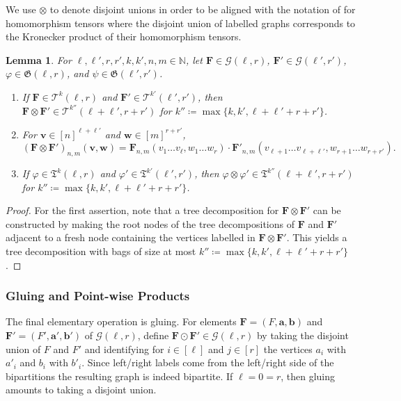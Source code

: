 \documentclass[11pt, DIV=15]{scrarticle}
\theoremstyle{definition}
\theoremstyle{plain}
\newtheorem{lemma}[definition]{Lemma}
\theoremstyle{remark}
\renewcommand{\phi}{\varphi}
\begin{document}
	We use $\otimes$ to denote disjoint unions in order to be aligned with the notation of \cite{mancinska_quantum_2020,seppelt_homomorphism_2024} for homomorphism tensors where the disjoint union of labelled graphs corresponds to the Kronecker product of their homomorphism tensors.
	\begin{lemma}\label{lem:disjoint-union}
		For $\ell, \ell', r,r', k, k', n, m \in \mathbb{N}$,
		let $\boldsymbol{F} \in \mathcal{G}(\ell, r)$,  $\boldsymbol{F}' \in \mathcal{G}(\ell', r')$,  $\phi \in \mathfrak{G}(\ell, r)$, and $\psi \in \mathfrak{G}(\ell', r')$.
		\begin{enumerate}
			\item If $\boldsymbol{F} \in \mathcal{T}^k(\ell, r)$ and $\boldsymbol{F}' \in \mathcal{T}^{k'}(\ell', r')$, then $\boldsymbol{F} \otimes \boldsymbol{F}' \in \mathcal{T}^{k''}(\ell+\ell', r+r')$ for $k'' \coloneqq \max\{k,k', \ell+\ell'+r+r'\}$.
			\item For $\boldsymbol{v} \in [n]^{\ell+\ell'}$ and $\boldsymbol{w} \in [m]^{r+r'}$, 
			\[
				(\boldsymbol{F} \otimes \boldsymbol{F}')_{n,m}(\boldsymbol{v}, \boldsymbol{w}) = \boldsymbol{F}_{n,m}(v_1 \dots v_\ell, w_1 \dots w_r) \cdot \boldsymbol{F}'_{n,m}(v_{\ell+1} \dots v_{\ell+ \ell'}, w_{r+1} \dots w_{r+r'}).
			\]
			\item If $\phi \in \mathfrak{T}^k(\ell, r)$ and $\phi' \in \mathfrak{T}^{k'}(\ell', r')$,
			then $\phi \otimes \phi' \in \mathfrak{T}^{k''}(\ell+\ell', r+r')$ for $k'' \coloneqq \max\{k,k', \ell+\ell'+r+r'\}$.
		\end{enumerate}
	\end{lemma}
	\begin{proof}
		For the first assertion, note that a tree decomposition for $\boldsymbol{F} \otimes \boldsymbol{F}'$ can be constructed by making the root nodes of the tree decompositions of $\boldsymbol{F}$ and $\boldsymbol{F}'$ adjacent to a fresh node containing the vertices labelled in $\boldsymbol{F} \otimes \boldsymbol{F}'$.
		This yields a tree decomposition with bags of size at most $k'' \coloneqq \max\{k,k', \ell+\ell'+r+r'\}$.
	\end{proof}

	\subsubsection{Gluing and Point-wise Products}
	The final elementary operation is gluing.
	For elements $\boldsymbol{F} = (F, \boldsymbol{a}, \boldsymbol{b})$ and $\boldsymbol{F}' = (F', \boldsymbol{a}', \boldsymbol{b}')$ of $\mathcal{G}(\ell, r)$,
	define $\boldsymbol{F} \odot \boldsymbol{F}' \in \mathcal{G}(\ell, r)$
	by taking the disjoint union of $F$ and $F'$ and identifying for $i \in [\ell]$ and $j \in [r]$ the vertices $a_i$ with $a'_i$ and $b_i$ with $b'_i$.
	Since left/right labels come from the left/right side of the bipartitions the resulting graph is indeed bipartite.
	If $\ell = 0 = r$, then gluing amounts to taking a disjoint union.
	
\end{document}
